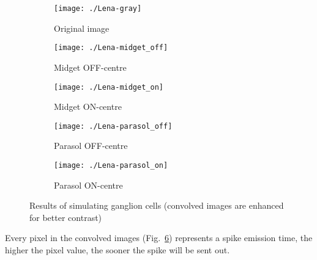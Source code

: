 \begin{figure}[hbt]
  \centering
  \begin{subfigure}[t]{0.32\textwidth}
    \centering
    \captionsetup{justification=centering,margin=0.1cm}
    \texttt{[image: ./Lena-gray]}
    \caption{Original image}
    \label{pic-lena}
  \end{subfigure}
  \begin{subfigure}[t]{0.32\textwidth}
    \centering
    \captionsetup{justification=centering,margin=0.1cm}
    \texttt{[image: ./Lena-midget\_off]}
    \caption{Midget OFF-centre}
    \label{pic-lena-M-OFF}
  \end{subfigure}
  \begin{subfigure}[t]{0.32\textwidth}
    \centering
    \captionsetup{justification=centering,margin=0.1cm}
    \texttt{[image: ./Lena-midget\_on]}
    \caption{Midget ON-centre}
    \label{pic-lena-M-ON}
  \end{subfigure}
  \begin{subfigure}[t]{0.32\textwidth}
    \vspace*{0.8em}
    \centering
    \captionsetup{justification=centering,margin=0.1cm}
    \texttt{[image: ./Lena-parasol\_off]}
    \caption{Parasol OFF-centre}
    \label{pic-lena-P-OFF}
  \end{subfigure}
  \begin{subfigure}[t]{0.32\textwidth}
    \vspace*{0.8em}
    \centering
    \captionsetup{justification=centering,margin=0.1cm}
    \texttt{[image: ./Lena-parasol\_on]}
    \caption{Parasol ON-centre}
    \label{pic-lena-P-ON}
  \end{subfigure}
  \caption{Results of simulating ganglion cells (convolved images are enhanced for better contrast)}
  \label{fig-convolution-results}
\end{figure}
Every pixel in the convolved images (Fig.~\ref{fig-convolution-results}) 
represents a spike emission time, the higher the pixel value, the sooner the 
spike will be sent out.

